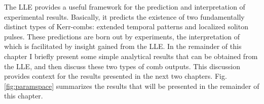 

The LLE provides a useful framework for the prediction and interpretation of experimental results. Basically, it predicts the existence of two fundamentally distinct types of Kerr-combs: extended temporal patterns and localized soliton pulses. These predictions are born out by experiments, the interpretation of which is facilitated by insight gained from the LLE. In the remainder of this chapter I briefly present some simple analytical results that can be obtained from the LLE, and then discuss these two types of comb outputs. This discussion provides context for the results presented in the next two chapters. Fig. \ref{fig:paramspace} summarizes the results that will be presented in the remainder of this chapter.
%

